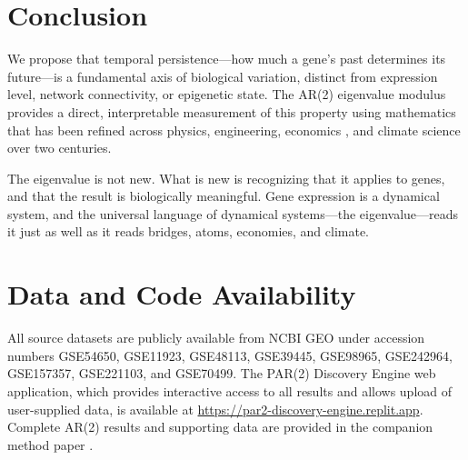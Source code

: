 \documentclass[11pt,letterpaper]{article}
\begin{document}
\section{Conclusion}

We propose that temporal persistence---how much a gene's past determines its future---is a fundamental axis of biological variation, distinct from expression level, network connectivity, or epigenetic state. The AR(2) eigenvalue modulus provides a direct, interpretable measurement of this property using mathematics that has been refined across physics, engineering, economics \citep{sims1980macroeconomics, granger1969investigating}, and climate science \citep{hasselmann1976stochastic} over two centuries.

The eigenvalue is not new. What is new is recognizing that it applies to genes, and that the result is biologically meaningful. Gene expression is a dynamical system, and the universal language of dynamical systems---the eigenvalue---reads it just as well as it reads bridges, atoms, economies, and climate.

\section{Data and Code Availability}

All source datasets are publicly available from NCBI GEO \citep{barrett2013ncbi} under accession numbers GSE54650, GSE11923, GSE48113, GSE39445, GSE98965, GSE242964, GSE157357, GSE221103, and GSE70499. The PAR(2) Discovery Engine web application, which provides interactive access to all results and allows upload of user-supplied data, is available at \url{https://par2-discovery-engine.replit.app}. Complete AR(2) results and supporting data are provided in the companion method paper \citep{whiteside2026par2a}.
\end{document}
